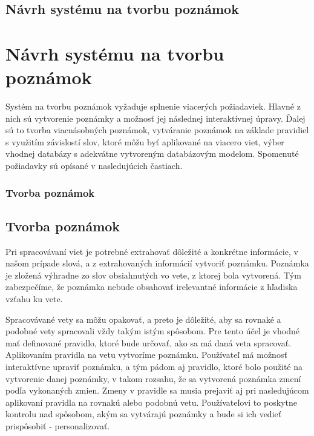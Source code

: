 \newpage
%
%
{
	\section{Návrh systému na tvorbu poznámok}
}
{
	\chapter{Návrh systému na tvorbu poznámok}
}
\label{design}
Systém na tvorbu poznámok vyžaduje splnenie viacerých požiadaviek. Hlavné z nich sú vytvorenie poznámky a možnosť jej následnej interaktívnej úpravy. Ďalej sú to tvorba viacnásobných poznámok, vytváranie poznámok na základe pravidiel s využitím závislostí slov, ktoré môžu byť aplikované na viacero viet, výber vhodnej databázy s adekvátne vytvoreným databázovým modelom. Spomenuté požiadavky sú opísané v nasledujúcich častiach.

%
%
{
	\subsection{Tvorba poznámok}
}
{
	\section{Tvorba poznámok}
}
\label{subsection:notes_creation}
Pri spracovávaní viet je potrebné extrahovať dôležité a konkrétne informácie, v našom prípade slová, a z extrahovaných informácií vytvoriť poznámku. Poznámka je zložená výhradne zo slov obsiahnutých vo vete, z ktorej bola vytvorená. Tým zabezpečíme, že poznámka nebude obsahovať irelevantné informácie z hľadiska vzťahu ku vete. 

Spracovávané vety sa môžu opakovať, a preto je dôležité, aby sa rovnaké a podobné vety spracovali vždy takým istým spôsobom. Pre tento účel je vhodné mať definované pravidlo, ktoré bude určovať, ako sa má daná veta spracovať. Aplikovaním pravidla na vetu vytvoríme poznámku. Používateľ má možnosť interaktívne upraviť poznámku, a tým pádom aj pravidlo, ktoré bolo použité na vytvorenie danej poznámky, v takom rozsahu, že sa vytvorená poznámka zmení podľa vykonaných zmien. Zmeny v pravidle sa musia prejaviť aj pri nasledujúcom aplikovaní pravidla na rovnakú alebo podobnú vetu. Používateľovi to poskytne kontrolu nad spôsobom, akým sa vytvárajú poznámky a bude si ich vedieť prispôsobiť - personalizovať.

